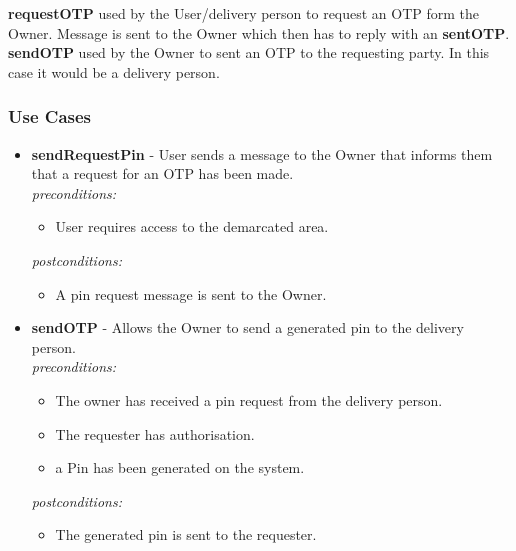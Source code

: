\documentclass[a4paper,12pt]{article}
\begin{document}
	{\noindent}\textbf{requestOTP} used by the User/delivery person to request an OTP form the Owner. Message is sent to the Owner which then has to reply with an \textbf{sentOTP}.\\
	
	{\noindent}\textbf{sendOTP} used by the Owner to sent an OTP to the requesting party. In this case it would be a delivery person.\\	 
	
	\subsubsection{Use Cases}
	
	\begin{itemize}
		\item \textbf{sendRequestPin} - User sends a message to the Owner that informs them that a request for an OTP has been made.\\[0.5cm]
		\textit{preconditions:}
		\begin{itemize}
			\item User requires access to the demarcated area.
		\end{itemize}
		
		\textit{postconditions:}
		\begin{itemize}
			\item A pin request message is sent to the Owner.\\[0.5cm]
		\end{itemize}
		
		\item \textbf{sendOTP} - Allows the Owner to send a generated pin to the delivery person.\\[0.5cm]
		\textit{preconditions:}
		\begin{itemize}
			\item The owner has received a pin request from the delivery person.
			\item The requester has authorisation.
			\item a Pin has been generated on the system.
		\end{itemize}
		
		\textit{postconditions:}
		\begin{itemize}
			\item The generated pin is sent to the requester.\\[0.5cm]
		\end{itemize}
	\end{itemize}
	
\end{document}
